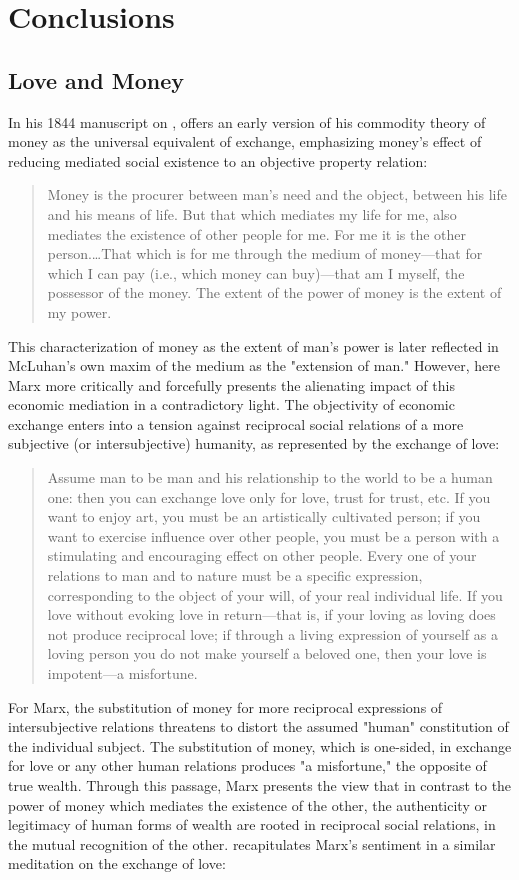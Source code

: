 \section{Conclusions}
\subsection*{Love and Money}
In his 1844 manuscript on , \citeauthor{MarxPowerMoney} offers an early version of his commodity theory of money as the universal equivalent of exchange, emphasizing money's effect of reducing mediated social existence to an objective property relation:
\blockquote{
  Money is the procurer between man's need and the object, between his life and his means of life. But that which mediates my life for me, also mediates the existence of other people for me. For me it is the other person.…That which is for me through the medium of money---that for which I can pay (i.e., which money can buy)---that am I myself, the possessor of the money. The extent of the power of money is the extent of my power.
}
This characterization of money as the extent of man's power is later reflected in McLuhan's own maxim of the medium as the "extension of man." However, here Marx more critically and forcefully presents the alienating impact of this economic mediation in a contradictory light. The objectivity of economic exchange enters into a tension against reciprocal social relations of a more subjective (or intersubjective) humanity, as represented by the exchange of love:
\blockquote{
  Assume man to be man and his relationship to the world to be a human one: then you can exchange love only for love, trust for trust, etc. If you want to enjoy art, you must be an artistically cultivated person; if you want to exercise influence over other people, you must be a person with a stimulating and encouraging effect on other people. Every one of your relations to man and to nature must be a specific expression, corresponding to the object of your will, of your real individual life. If you love without evoking love in return---that is, if your loving as loving does not produce reciprocal love; if through a living expression of yourself as a loving person you do not make yourself a beloved one, then your love is impotent---a misfortune.
}
For Marx, the substitution of money for more reciprocal expressions of intersubjective relations threatens to distort the assumed "human" constitution of the individual subject. The substitution of money, which is one-sided, in exchange for love or any other human relations produces "a misfortune," the opposite of true wealth. Through this passage, Marx presents the view that in contrast to the power of money which mediates the existence of the other, the authenticity or legitimacy of human forms of wealth are rooted in reciprocal social relations, in the mutual recognition of the other. \citeauthor{Simmel04} recapitulates Marx's sentiment in a similar meditation on the exchange of love:

